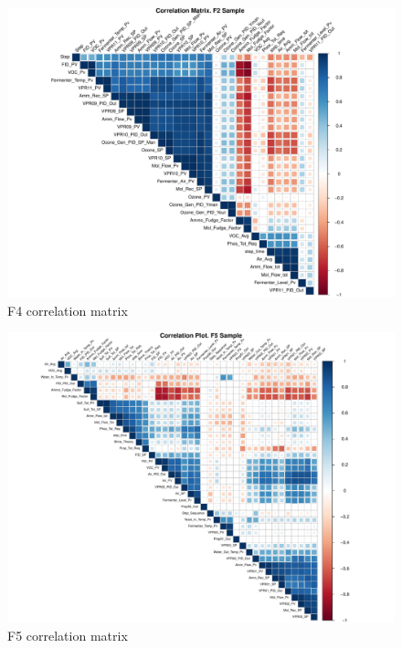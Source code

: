 \begin{figure}[ht]
    \centering
    \includegraphics[width=1\textwidth]{plots/f4_correlation.pdf}
    \caption{F4 correlation matrix}
    \label{fig:f4_correlation}
\end{figure}

\begin{figure}[ht]
    \centering
    \includegraphics[width=1\textwidth]{plots/f5_sample_correlation.pdf}
    \caption{F5 correlation matrix}
    \label{fig:f5_correlation}
\end{figure}


